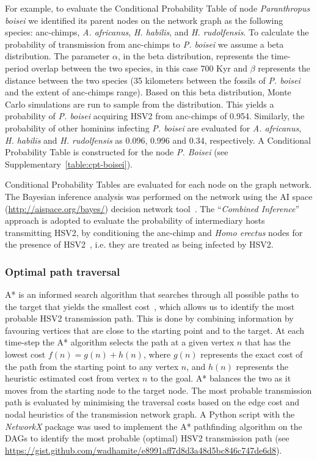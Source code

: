 \documentclass[fleqn,10pt]{wlscirep}
\begin{document}
For example, to evaluate the Conditional Probability Table of node \textit{Paranthropus boisei} we identified its parent nodes on the network graph as the following species: anc-chimps, \textit{A. africanus}, \textit{H. habilis}, and \textit{H. rudolfensis}. To calculate the probability of transmission from anc-chimps to \textit{P. boisei} we assume a beta distribution. The parameter $\alpha$, in the beta distribution, represents the time-period overlap between the two species, in this case 700 Kyr and $\beta$ represents the distance between the two species (35 kilometers between the fossils of \textit{P. boisei} and the extent of anc-chimps range). Based on this beta distribution, Monte Carlo simulations are run to sample from the distribution. This yields a probability of \textit{P. boisei} acquiring HSV2 from anc-chimps of 0.954. Similarly, the probability of other hominins infecting \textit{P. boisei} are evaluated for \textit{A. africanus}, \textit{H. habilis} and \textit{H. rudolfensis} as 0.096, 0.996 and 0.34, respectively.  A Conditional Probability Table is constructed for the node \textit{P. Boisei} (see Supplementary~\cref{table:cpt-boisei}).

Conditional Probability Tables are evaluated for each node on the graph network. The Bayesian inference analysis was performed on the network using the AI space (\url{http://aispace.org/bayes/}) decision network tool~\citep{poole2010artificial}. The ``\textit{Combined Inference}'' approach is adopted to evaluate the probability of intermediary hosts transmitting HSV2, by conditioning the anc-chimp and \textit{Homo erectus} nodes for the presence of HSV2~\citep{Korb2003}, i.e. they are treated as being infected by HSV2.

\subsubsection*{Optimal path traversal}

A* is an informed search algorithm that searches through all possible paths to the target that yields the smallest cost~\citep{Hart1968}, which allows us to identify the most probable HSV2 transmission path. This is done by combining information by favouring vertices that are close to the starting point and to the target. At each time-step the A* algorithm selects the path at a given vertex $n$ that has the lowest cost $f(n) = g(n) + h(n)$, where $g(n)$ represents the exact cost of the path from the starting point to any vertex $n$, and $h(n)$ represents the heuristic estimated cost from vertex $n$ to the goal. A* balances the two as it moves from the starting node to the target node. The most probable transmission path is evaluated by minimising the traversal costs based on the edge cost and nodal heuristics of the transmission network graph. A Python script with the \textit{NetworkX} package was used to implement the A* pathfinding algorithm on the DAGs to identify the most probable (optimal) HSV2 transmission path (see \url{https://gist.github.com/wadhamite/e8991aff7d8d3a48d5bc846c747de6d8}).
\end{document}
